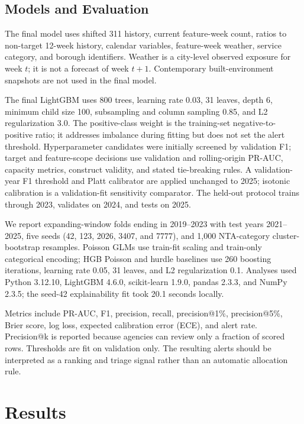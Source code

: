 \documentclass[pdflatex,sn-mathphys-num]{sn-jnl}
\begin{document}
\subsection{Models and Evaluation}\label{subsec:models_eval}

The final model uses shifted 311 history, current feature-week count, ratios to non-target 12-week history, calendar variables, feature-week weather, service category, and borough identifiers. Weather is a city-level observed exposure for week \(t\); it is not a forecast of week \(t+1\). Contemporary built-environment snapshots are not used in the final model.

The final LightGBM uses 800 trees, learning rate 0.03, 31 leaves, depth 6, minimum child size 100, subsampling and column sampling 0.85, and L2 regularization 3.0. The positive-class weight is the training-set negative-to-positive ratio; it addresses imbalance during fitting but does not set the alert threshold. Hyperparameter candidates were initially screened by validation F1; target and feature-scope decisions use validation and rolling-origin PR-AUC, capacity metrics, construct validity, and stated tie-breaking rules. A validation-year F1 threshold and Platt calibrator are applied unchanged to 2025; isotonic calibration is a validation-fit sensitivity comparator. The held-out protocol trains through 2023, validates on 2024, and tests on 2025.

We report expanding-window folds ending in 2019--2023 with test years 2021--2025, five seeds (42, 123, 2026, 3407, and 7777), and 1,000 NTA-category cluster-bootstrap resamples. Poisson GLMs use train-fit scaling and train-only categorical encoding; HGB Poisson and hurdle baselines use 260 boosting iterations, learning rate 0.05, 31 leaves, and L2 regularization 0.1. Analyses used Python 3.12.10, LightGBM 4.6.0, scikit-learn 1.9.0, pandas 2.3.3, and NumPy 2.3.5; the seed-42 explainability fit took 20.1 seconds locally.

Metrics include PR-AUC, F1, precision, recall, precision@1\%, precision@5\%, Brier score, log loss, expected calibration error (ECE), and alert rate. Precision@k is reported because agencies can review only a fraction of scored rows. Thresholds are fit on validation only. The resulting alerts should be interpreted as a ranking and triage signal rather than an automatic allocation rule.

\section{Results}\label{sec:results}
\end{document}
